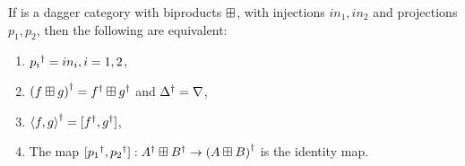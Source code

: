 \begin{lemma}\label{lemma:daggerbiproducts}
If \cD{} is a dagger category with biproducts $\boxplus$, with injections $in_{1},in_{2}$ and projections
$p_{1},p_{2}$, then the following are equivalent:
\begin{enumerate}[{(}i{)}]
  \item ${p_{i}}^{\dagger} = in_{i}, i=1,2$, \label{ldpdgrpisq}
  \item ${(f\boxplus g)}^{\dagger} = {f}^{\dagger}\boxplus {g}^{\dagger}$ and ${\Delta}^{\dagger} = \nabla$,\label{ldpddeltisnab}
  \item ${\langle f,g\rangle}^{\dagger} = [{f}^{\dagger},{g}^{\dagger}]$,\label{ldpdcopisprod}
  \item The map $[{p_{1}}^{\dagger},{p_{2}}^{\dagger}]: {A}^{\dagger} \boxplus {B}^{\dagger} \to {(A\boxplus B)}^{\dagger}$ is
    the identity map.\label{ldpcommute}
\end{enumerate}
\end{lemma}
